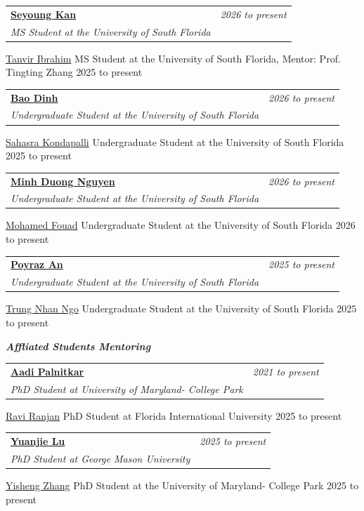 \documentclass[a4paper,11pt]{article}
\makeatletter
\newcommand{\resumeProject}[4]{
\vspace{0.5mm}\item
    \begin{tabular*}{0.98\textwidth}[t]{l@{\extracolsep{\fill}}r}
        \textbf{#1} & \textit{\footnotesize{#3}} \\
        \footnotesize{\textit{#2}} & \footnotesize{#4}
    \end{tabular*}
    \vspace{-2.4mm}
}
\makeatother
\begin{document}
\resumeProject
  {\href{https://www.linkedin.com/in/seyoung-kan-75b2212b8/}{Seyoung Kan}}
  {MS Student at the University of South Florida}
  {2026 to present}

\resumeProject
  {\href{https://www.linkedin.com/in/tanvir-ibrahim-t11/}{Tanvir Ibrahim}}
  {MS Student at the University of South Florida, Mentor: Prof. Tingting Zhang}
  {2025 to present}


\resumeProject
  {\href{https://www.linkedin.com/in/baodn/}{Bao Dinh}}
  {Undergraduate Student at the University of South Florida}
  {2026 to present}

\resumeProject
  {\href{https://www.linkedin.com/in/sahasra-kondapalli/}{Sahasra Kondapalli}}
  {Undergraduate Student at the University of South Florida}
  {2025 to present}

\resumeProject
  {\href{https://www.linkedin.com/in/minh-duong-nguyen-/}{Minh Duong Nguyen}}
  {Undergraduate Student at the University of South Florida}
  {2026 to present}

\resumeProject
  {\href{https://www.linkedin.com/in/mohamed-fouad9/}{Mohamed Fouad}}
  {Undergraduate Student at the University of South Florida}
  {2026 to present}

\resumeProject
  {\href{https://www.linkedin.com/in/poyan09/}{Poyraz An}}
  {Undergraduate Student at the University of South Florida}
  {2025 to present}

\resumeProject
  {\href{https://www.linkedin.com/in/trung-nhan-ngo-usf/}{Trung Nhan Ngo}}
  {Undergraduate Student at the University of South Florida}
  {2025 to present}
  
\vspace{4mm}
\textit{\textbf{Affliated Students Mentoring}}
\vspace{0.4mm}

\resumeProject
  {\href{https://www.linkedin.com/in/aadi-palnitkar/}{Aadi Palnitkar}}
  {PhD Student at University of Maryland- College Park}
  {2021 to present}

\resumeProject
  {\href{https://www.linkedin.com/in/rvranjan/}{Ravi Ranjan}}
  {PhD Student at Florida International University}
  {2025 to present}

\resumeProject
  {\href{https://chais.gmu.edu/person/yuanjie-lu/}{Yuanjie Lu}}
  {PhD Student at George Mason University}
  {2025 to present}

\resumeProject
  {\href{https://www.linkedin.com/in/yisheng-zhang-377039329/}{Yisheng Zhang}}
  {PhD Student at the University of Maryland- College Park}
  {2025 to present}
\end{document}
